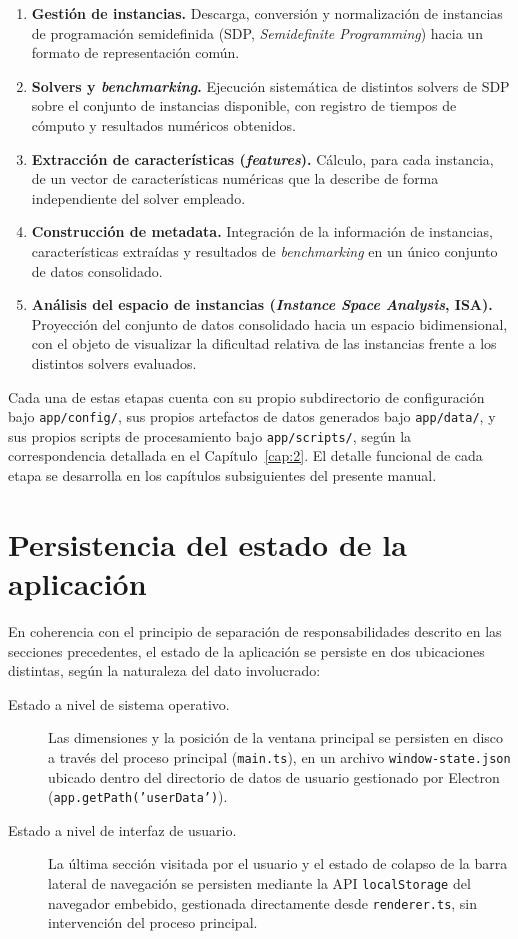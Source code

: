 \begin{enumerate}
    \item \textbf{Gesti\'on de instancias.} Descarga, conversi\'on y
    normalizaci\'on de instancias de programaci\'on semidefinida (SDP,
    \emph{Semidefinite Programming}) hacia un formato de representaci\'on
    com\'un.
    \item \textbf{Solvers y \emph{benchmarking}.} Ejecuci\'on sistem\'atica
    de distintos solvers de SDP sobre el conjunto de instancias disponible,
    con registro de tiempos de c\'omputo y resultados num\'ericos obtenidos.
    \item \textbf{Extracci\'on de caracter\'isticas (\emph{features}).}
    C\'alculo, para cada instancia, de un vector de caracter\'isticas
    num\'ericas que la describe de forma independiente del solver empleado.
    \item \textbf{Construcci\'on de metadata.} Integraci\'on de la
    informaci\'on de instancias, caracter\'isticas extra\'idas y resultados
    de \emph{benchmarking} en un \'unico conjunto de datos consolidado.
    \item \textbf{An\'alisis del espacio de instancias (\emph{Instance Space
    Analysis}, ISA).} Proyecci\'on del conjunto de datos consolidado hacia
    un espacio bidimensional, con el objeto de visualizar la dificultad
    relativa de las instancias frente a los distintos solvers evaluados.
\end{enumerate}

Cada una de estas etapas cuenta con su propio subdirectorio de
configuraci\'on bajo \texttt{app/config/}, sus propios artefactos de datos
generados bajo \texttt{app/data/}, y sus propios scripts de procesamiento
bajo \texttt{app/scripts/}, seg\'un la correspondencia detallada en el
Cap\'itulo~\ref{cap:2}. El detalle funcional de cada etapa se desarrolla en
los cap\'itulos subsiguientes del presente manual.

\section{Persistencia del estado de la aplicaci\'on}

En coherencia con el principio de separaci\'on de responsabilidades descrito
en las secciones precedentes, el estado de la aplicaci\'on se persiste en
dos ubicaciones distintas, seg\'un la naturaleza del dato involucrado:

\begin{description}
    \item[Estado a nivel de sistema operativo.] Las dimensiones y la
    posici\'on de la ventana principal se persisten en disco a trav\'es del
    proceso principal (\texttt{main.ts}), en un archivo
    \texttt{window-state.json} ubicado dentro del directorio de datos de
    usuario gestionado por Electron (\texttt{app.getPath('userData')}).
    \item[Estado a nivel de interfaz de usuario.] La \'ultima secci\'on
    visitada por el usuario y el estado de colapso de la barra lateral de
    navegaci\'on se persisten mediante la API \texttt{localStorage} del
    navegador embebido, gestionada directamente desde \texttt{renderer.ts},
    sin intervenci\'on del proceso principal.
\end{description}
